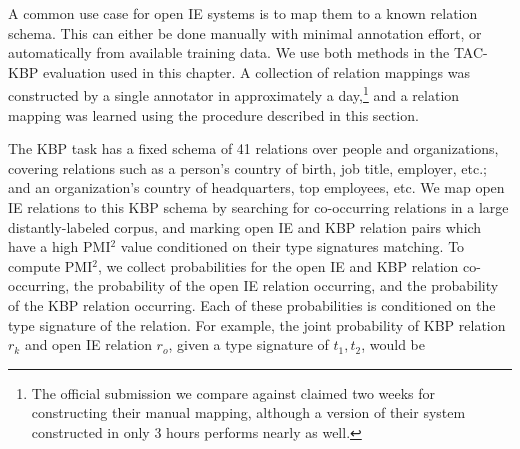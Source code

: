 A common use case for open IE systems is to map them to a
  known relation schema.
This can either be done manually with minimal annotation effort, or
  automatically from available training data.
We use both methods in the TAC-KBP evaluation used in this chapter.
A collection of relation mappings was constructed by a single
  annotator in approximately a day,\footnote{
    The official submission we compare against claimed two weeks for constructing
    their manual mapping, although a version of their system constructed in only
    3 hours performs nearly as well.
  } and a relation mapping was learned
  using the procedure described in this section.


The KBP task has a fixed schema of 41 relations over people and organizations, covering relations such as
  a person's country of birth, job title, employer, etc.; and an organization's
  country of headquarters, top employees, etc.
We map open IE relations to this KBP schema by searching for co-occurring
  relations in a large distantly-labeled corpus, and marking open IE and
  KBP relation pairs which have a high PMI$^2$ value
  \cite{key:1994dailee-pmisquared,key:2005evert-pmi}
  conditioned on their
  type signatures matching.
To compute PMI$^2$, we collect probabilities for the open IE and KBP
  relation co-occurring, the probability of the open IE relation occurring,
  and the probability of the KBP relation occurring.
Each of these probabilities is conditioned on the type signature of the relation.
For example, the joint probability of KBP relation $r_k$ and open IE relation
  $r_o$, given a type signature of $t_1, t_2$, would be

